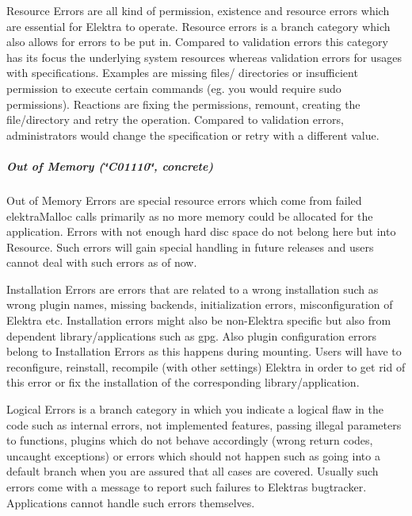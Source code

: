 {\ttfamily Resource Errors} are all kind of permission, existence and resource errors which are essential for Elektra to operate. Resource errors is a branch category which also allows for errors to be put in. Compared to validation errors this category has its focus the underlying system resources whereas validation errors for usages with specifications. Examples are missing files/ directories or insufficient permission to execute certain commands (eg. you would require sudo permissions). Reactions are fixing the permissions, remount, creating the file/directory and retry the operation. Compared to validation errors, administrators would change the specification or retry with a different value.

\label{doc_dev_error-categorization_md_autotoc_md1469}%
%
\subparagraph*{Out of Memory (\char`\"{}\+C01110\char`\"{}, concrete)}

{\ttfamily Out of Memory Errors} are special resource errors which come from failed {\ttfamily elektra\+Malloc} calls primarily as no more memory could be allocated for the application. Errors with not enough hard disc space do not belong here but into {\ttfamily Resource}. Such errors will gain special handling in future releases and users cannot deal with such errors as of now.

{\ttfamily Installation Errors} are errors that are related to a wrong installation such as wrong plugin names, missing backends, initialization errors, misconfiguration of Elektra etc. Installation errors might also be non-\/\+Elektra specific but also from dependent library/applications such as gpg. Also plugin configuration errors belong to {\ttfamily Installation Errors} as this happens during mounting. Users will have to reconfigure, reinstall, recompile (with other settings) Elektra in order to get rid of this error or fix the installation of the corresponding library/application.

{\ttfamily Logical Errors} is a branch category in which you indicate a logical flaw in the code such as internal errors, not implemented features, passing illegal parameters to functions, plugins which do not behave accordingly (wrong return codes, uncaught exceptions) or errors which should not happen such as going into a {\ttfamily default} branch when you are assured that all cases are covered. Usually such errors come with a message to report such failures to Elektra\textquotesingle{}s bugtracker. Applications cannot handle such errors themselves.

